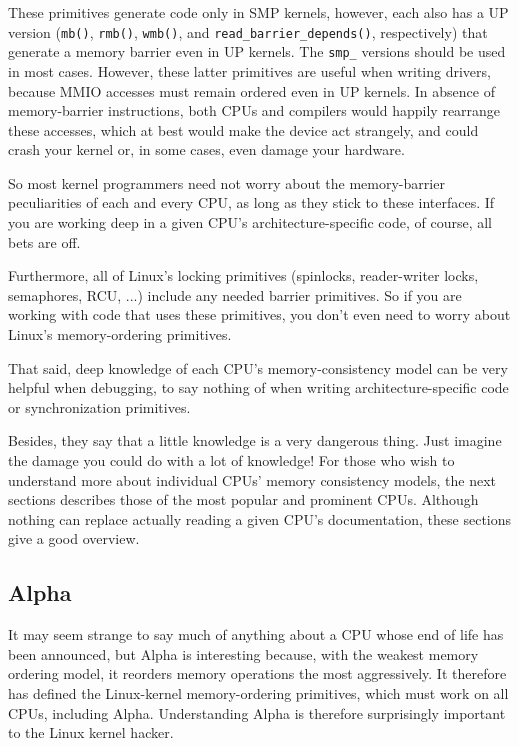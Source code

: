 These primitives generate code only in SMP kernels, however, each
also has a UP version ({\tt mb()}, {\tt rmb()}, {\tt wmb()},
and {\tt read\_barrier\_depends()},
respectively) that generate a memory barrier even in UP kernels. The {\tt smp\_}
versions should be used in most cases. However, these latter primitives
are useful when writing drivers, because MMIO accesses must remain
ordered even in UP kernels. In absence of memory-barrier instructions,
both CPUs and compilers would happily rearrange these accesses, which at
best would make the device act strangely, and could crash your kernel or,
in some cases, even damage your hardware.

So most kernel programmers need not worry about the memory-barrier
peculiarities of each and every CPU, as long as they stick to these
interfaces.
If you are working deep in a given CPU's architecture-specific code,
of course, all bets are off.

Furthermore,
all of Linux's locking primitives (spinlocks, reader-writer locks,
semaphores, RCU, ...) include any needed barrier primitives.
So if you are working with code that uses these primitives, you don't
even need to worry about Linux's memory-ordering primitives.

That said, deep knowledge of each CPU's memory-consistency model
can be very helpful when debugging, to say nothing of when writing
architecture-specific code or synchronization primitives.

Besides, they say that a little knowledge is a very dangerous thing.
Just imagine the damage you could do with a lot of knowledge!
For those who wish to understand more about individual CPUs'
memory consistency models, the next sections describes those of the
most popular and prominent CPUs.
Although nothing can replace actually reading a given CPU's documentation,
these sections give a good overview.

\subsection{Alpha}

It may seem strange to say much of anything about a CPU whose end of life
has been announced, but Alpha is interesting because, with the weakest
memory ordering model, it reorders memory operations the most aggressively.
It therefore has defined the Linux-kernel memory-ordering primitives,
which must work on all CPUs, including Alpha.
Understanding Alpha is therefore surprisingly important to the Linux kernel
hacker.

